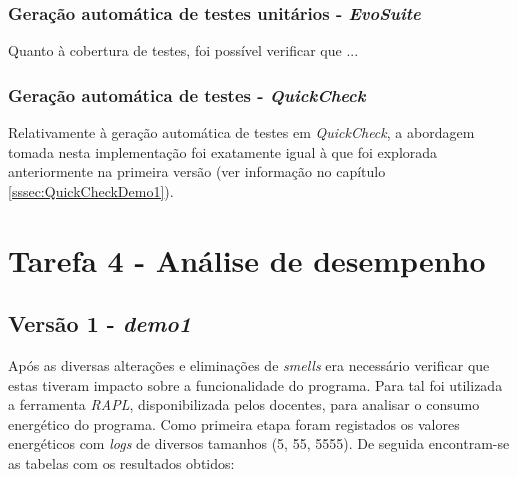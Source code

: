\documentclass[a4paper]{report}
\begin{document}
\subsubsection{Geração automática de testes unitários - \textit{EvoSuite}}

Quanto à cobertura de testes, foi possível verificar que ...

\subsubsection{Geração automática de testes - \textit{QuickCheck}}
Relativamente à geração automática de testes em \textit{QuickCheck}, a abordagem tomada nesta implementação foi exatamente igual à que foi explorada anteriormente na primeira versão (ver informação no capítulo \ref{sssec:QuickCheckDemo1}).


\section{Tarefa 4 - Análise de desempenho}
\subsection{Versão 1 - \textit{demo1}}
Após as diversas alterações e eliminações de \textit{smells} era necessário verificar que estas tiveram impacto sobre a funcionalidade do programa. Para tal foi utilizada a ferramenta \textit{RAPL}, disponibilizada pelos docentes, para analisar o consumo energético do programa. Como primeira etapa foram registados os valores energéticos com \textit{logs} de diversos tamanhos (5, 55, 5555). De seguida encontram-se as tabelas com os resultados obtidos:
\end{document}
